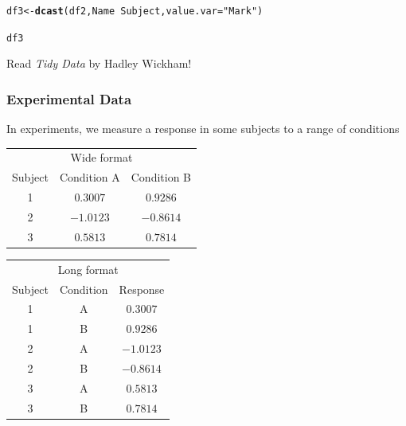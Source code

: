 \documentclass[12pt]{article}\usepackage[]{graphicx}\usepackage[]{xcolor}
\makeatletter
\newcommand{\hlsng}[1]{\textcolor[rgb]{0.192,0.494,0.8}{#1}}%
\newcommand{\hlopt}[1]{\textcolor[rgb]{0,0,0}{#1}}%
\newcommand{\hldef}[1]{\textcolor[rgb]{0.345,0.345,0.345}{#1}}%
\newcommand{\hlkwb}[1]{\textcolor[rgb]{0.69,0.353,0.396}{#1}}%
\newcommand{\hlkwc}[1]{\textcolor[rgb]{0.333,0.667,0.333}{#1}}%
\newcommand{\hlkwd}[1]{\textcolor[rgb]{0.737,0.353,0.396}{\textbf{#1}}}%
\newenvironment{kframe}{%
 \def\at@end@of@kframe{}%
 \ifinner\ifhmode%
  \def\at@end@of@kframe{\end{minipage}}%
  \begin{minipage}{\columnwidth}%
 \fi\fi%
 \def\FrameCommand##1{\hskip\@totalleftmargin \hskip-\fboxsep
 \colorbox{shadecolor}{##1}\hskip-\fboxsep
     \hskip-\linewidth \hskip-\@totalleftmargin \hskip\columnwidth}%
 \MakeFramed {\advance\hsize-\width
   \@totalleftmargin\z@ \linewidth\hsize
   \@setminipage}}%
 {\par\unskip\endMakeFramed%
 \at@end@of@kframe}
\newenvironment{knitrout}{}{} %
\makeatother
\begin{document}
\begin{knitrout}
\color{fgcolor}\begin{kframe}
\begin{alltt}
\hldef{df3} \hlkwb{<-} \hlkwd{dcast}\hldef{(df2,Name}\hlopt{~}\hldef{Subject,}\hlkwc{value.var}\hldef{=}\hlsng{"Mark"}\hldef{)}
\end{alltt}


{\ttfamily\noindent\bfseries{}}\begin{alltt}
\hldef{df3}
\end{alltt}


{\ttfamily\noindent\bfseries\color{errorcolor}{\#\# Error:\\\#\# ! object 'df3' not found}}\end{kframe}
\end{knitrout}

Read \textit{Tidy Data} by Hadley Wickham!

\subsubsection*{Experimental Data}

In experiments, we measure a response in some subjects to a range of conditions  

    \begin{center}
     \begin{tabular}[t]{c|c|c}
       \multicolumn{3}{c}{Wide format}\\[1ex]
       Subject & Condition A & Condition B \\
      \hline
       1 & \(0.3007\) & \(0.9286\) \\
       2 & \(-1.0123\) & \(-0.8614\) \\
       3 & \(0.5813\) & \(0.7814\) \\
     \end{tabular}
     \qquad
     \begin{tabular}[t]{c|c|c}
       \multicolumn{3}{c}{Long format}\\[1ex]
       Subject & Condition & Response\\
      \hline
       1 & A & \(0.3007\)\\
       1 & B & \(0.9286\) \\
       2 & A & \(-1.0123\) \\
       2 & B & \(-0.8614\) \\
       3 & A & \(0.5813\) \\ 
       3 & B & \(0.7814\)\\
     \end{tabular}
   \end{center}
\end{document}
